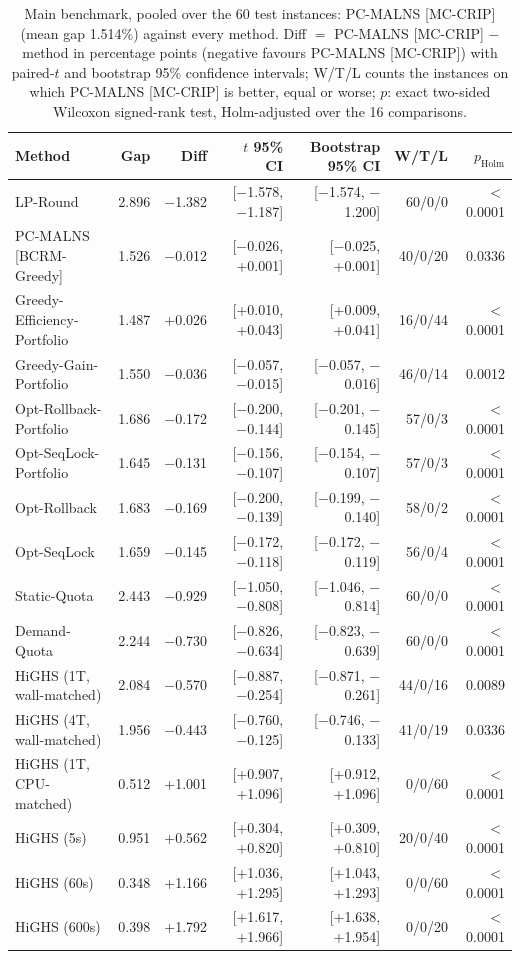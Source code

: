 \begin{table}[!htb]
\centering
\caption{Main benchmark, pooled over the 60 test instances: PC-MALNS [MC-CRIP] (mean gap 1.514\%) against every method. Diff $=$ PC-MALNS [MC-CRIP] $-$ method in percentage points (negative favours PC-MALNS [MC-CRIP]) with paired-$t$ and bootstrap 95\% confidence intervals; W/T/L counts the instances on which PC-MALNS [MC-CRIP] is better, equal or worse; $p$: exact two-sided Wilcoxon signed-rank test, Holm-adjusted over the 16 comparisons.}
\label{tab:main_tests}
\footnotesize
\begin{tabular}{@{}lrrrrrr@{}}
\toprule
Method & Gap & Diff & $t$ 95\% CI & Bootstrap 95\% CI & W/T/L & $p_{\text{Holm}}$ \\
\midrule
LP-Round & 2.896 & $-$1.382 & [$-$1.578, $-$1.187] & [$-$1.574, $-$1.200] & 60/0/0 & $<$0.0001 \\
PC-MALNS [BCRM-Greedy] & 1.526 & $-$0.012 & [$-$0.026, +0.001] & [$-$0.025, +0.001] & 40/0/20 & 0.0336 \\
Greedy-Efficiency-Portfolio & 1.487 & +0.026 & [+0.010, +0.043] & [+0.009, +0.041] & 16/0/44 & $<$0.0001 \\
Greedy-Gain-Portfolio & 1.550 & $-$0.036 & [$-$0.057, $-$0.015] & [$-$0.057, $-$0.016] & 46/0/14 & 0.0012 \\
Opt-Rollback-Portfolio & 1.686 & $-$0.172 & [$-$0.200, $-$0.144] & [$-$0.201, $-$0.145] & 57/0/3 & $<$0.0001 \\
Opt-SeqLock-Portfolio & 1.645 & $-$0.131 & [$-$0.156, $-$0.107] & [$-$0.154, $-$0.107] & 57/0/3 & $<$0.0001 \\
Opt-Rollback & 1.683 & $-$0.169 & [$-$0.200, $-$0.139] & [$-$0.199, $-$0.140] & 58/0/2 & $<$0.0001 \\
Opt-SeqLock & 1.659 & $-$0.145 & [$-$0.172, $-$0.118] & [$-$0.172, $-$0.119] & 56/0/4 & $<$0.0001 \\
Static-Quota & 2.443 & $-$0.929 & [$-$1.050, $-$0.808] & [$-$1.046, $-$0.814] & 60/0/0 & $<$0.0001 \\
Demand-Quota & 2.244 & $-$0.730 & [$-$0.826, $-$0.634] & [$-$0.823, $-$0.639] & 60/0/0 & $<$0.0001 \\
HiGHS (1T, wall-matched) & 2.084 & $-$0.570 & [$-$0.887, $-$0.254] & [$-$0.871, $-$0.261] & 44/0/16 & 0.0089 \\
HiGHS (4T, wall-matched) & 1.956 & $-$0.443 & [$-$0.760, $-$0.125] & [$-$0.746, $-$0.133] & 41/0/19 & 0.0336 \\
HiGHS (1T, CPU-matched) & 0.512 & +1.001 & [+0.907, +1.096] & [+0.912, +1.096] & 0/0/60 & $<$0.0001 \\
HiGHS (5s) & 0.951 & +0.562 & [+0.304, +0.820] & [+0.309, +0.810] & 20/0/40 & $<$0.0001 \\
HiGHS (60s) & 0.348 & +1.166 & [+1.036, +1.295] & [+1.043, +1.293] & 0/0/60 & $<$0.0001 \\
HiGHS (600s) & 0.398 & +1.792 & [+1.617, +1.966] & [+1.638, +1.954] & 0/0/20 & $<$0.0001 \\
\bottomrule
\end{tabular}
\end{table}

